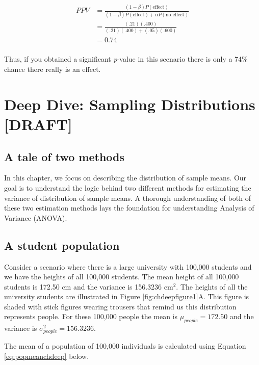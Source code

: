\documentclass[
]{krantz}
\begin{document}
\[
\begin{aligned}
PPV &= \frac{(1 - \beta)P(\text{effect})}{(1 - \beta)P(\text{effect}) + \alpha P(\text{no effect})}\\
&= \frac{(.21)(.400)}{(.21)(.400) + (.05)(.600)}\\
&= 0.74\\
\end{aligned}
\]

Thus, if you obtained a significant \emph{p}-value in this scenario there is only a 74\% chance there really is an effect.

\hypertarget{deep-dive-sampling-distributions-draft}{%
\chapter{Deep Dive: Sampling Distributions {[}DRAFT{]}}\label{deep-dive-sampling-distributions-draft}}

\hypertarget{a-tale-of-two-methods}{%
\section{A tale of two methods}\label{a-tale-of-two-methods}}

In this chapter, we focus on describing the distribution of sample means. Our goal is to understand the logic behind two different methods for estimating the variance of distribution of sample means. A thorough understanding of both of these two estimation methods lays the foundation for understanding Analysis of Variance (ANOVA).

\hypertarget{a-student-population}{%
\section{A student population}\label{a-student-population}}

Consider a scenario where there is a large university with 100,000 students and we have the heights of all 100,000 students. The mean height of all 100,000 students is 172.50 cm and the variance is 156.3236 cm\(^2\). The heights of all the university students are illustrated in Figure \ref{fig:chdeepfigure1}A. This figure is shaded with stick figures wearing trousers that remind us this distribution represents people. For these 100,000 people the mean is \(\mu_{people}=172.50\) and the variance is \(\sigma_{people}^2=156.3236\).

The mean of a population of 100,000 individuals is calculated using Equation \eqref{eq:popmeanchdeep} below.
\end{document}
